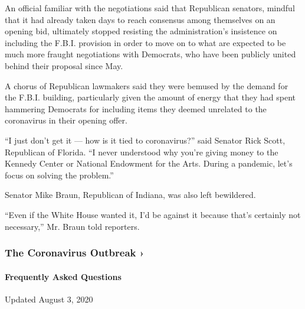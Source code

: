 An official familiar with the negotiations said that Republican
senators, mindful that it had already taken days to reach consensus
among themselves on an opening bid, ultimately stopped resisting the
administration's insistence on including the F.B.I. provision in order
to move on to what are expected to be much more fraught negotiations
with Democrats, who have been publicly united behind their proposal
since May.

A chorus of Republican lawmakers said they were bemused by the demand
for the F.B.I. building, particularly given the amount of energy that
they had spent hammering Democrats for including items they deemed
unrelated to the coronavirus in their opening offer.

``I just don't get it --- how is it tied to coronavirus?'' said Senator
Rick Scott, Republican of Florida. ``I never understood why you're
giving money to the Kennedy Center or National Endowment for the Arts.
During a pandemic, let's focus on solving the problem.''

Senator Mike Braun, Republican of Indiana, was also left bewildered.

``Even if the White House wanted it, I'd be against it because that's
certainly not necessary,'' Mr. Braun told reporters.

\href{https://www.nytimes3xbfgragh.onion/news-event/coronavirus?action=click\&pgtype=Article\&state=default\&region=MAIN_CONTENT_3\&context=storylines_faq}{}

\hypertarget{the-coronavirus-outbreak-}{%
\subsubsection{The Coronavirus Outbreak
›}\label{the-coronavirus-outbreak-}}

\hypertarget{frequently-asked-questions}{%
\paragraph{Frequently Asked
Questions}\label{frequently-asked-questions}}

Updated August 3, 2020


